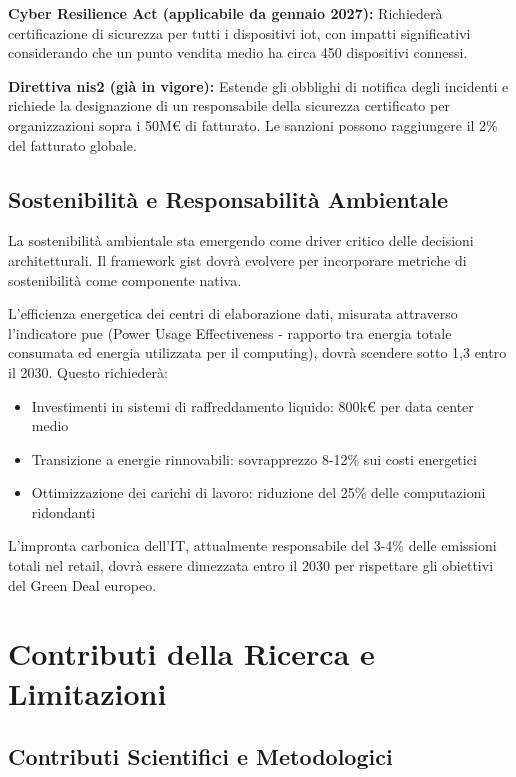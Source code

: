 \textbf{Cyber Resilience Act (applicabile da gennaio 2027):} Richiederà certificazione di sicurezza per tutti i dispositivi \gls{iot}, con impatti significativi considerando che un punto vendita medio ha circa 450 dispositivi connessi.

\textbf{Direttiva \gls{nis2} (già in vigore):} Estende gli obblighi di notifica degli incidenti e richiede la designazione di un responsabile della sicurezza certificato per organizzazioni sopra i 50M€ di fatturato. Le sanzioni possono raggiungere il 2\% del fatturato globale.

\subsection{\texorpdfstring{Sostenibilità e Responsabilità Ambientale}{5.5.3 - Sostenibilità e Responsabilità Ambientale}}
\label{subsec:5.5.3}

La sostenibilità ambientale sta emergendo come driver critico delle decisioni architetturali. Il framework \gls{gist} dovrà evolvere per incorporare metriche di sostenibilità come componente nativa.

L'efficienza energetica dei centri di elaborazione dati, misurata attraverso l'indicatore \gls{pue} (Power Usage Effectiveness - rapporto tra energia totale consumata ed energia utilizzata per il computing), dovrà scendere sotto 1,3 entro il 2030. Questo richiederà:
\begin{itemize}
\item Investimenti in sistemi di raffreddamento liquido: 800k€ per data center medio
\item Transizione a energie rinnovabili: sovrapprezzo 8-12\% sui costi energetici
\item Ottimizzazione dei carichi di lavoro: riduzione del 25\% delle computazioni ridondanti
\end{itemize}

L'impronta carbonica dell'IT, attualmente responsabile del 3-4\% delle emissioni totali nel retail, dovrà essere dimezzata entro il 2030 per rispettare gli obiettivi del Green Deal europeo.

\section{\texorpdfstring{Contributi della Ricerca e Limitazioni}{5.6 - Contributi della Ricerca e Limitazioni}}
\label{sec:5.6}

\subsection{\texorpdfstring{Contributi Scientifici e Metodologici}{5.6.1 - Contributi Scientifici e Metodologici}}
\label{subsec:5.6.1}

